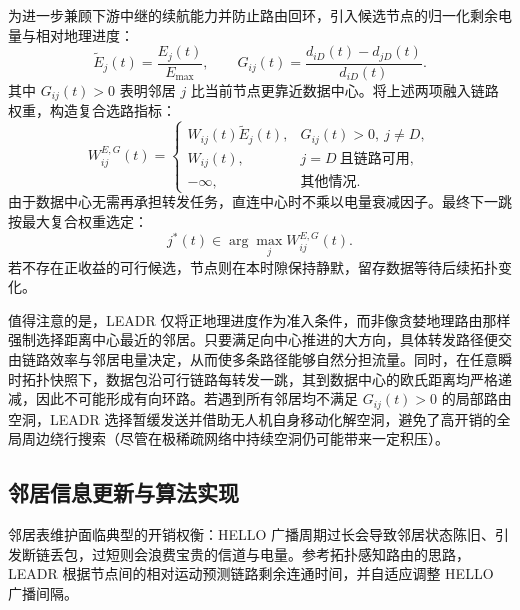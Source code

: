 为进一步兼顾下游中继的续航能力并防止路由回环，引入候选节点的归一化剩余电量与相对地理进度：
\begin{equation}
 \widetilde E_j(t)=\frac{E_j(t)}{E_{\max}},\qquad
 G_{ij}(t)=\frac{d_{iD}(t)-d_{jD}(t)}{d_{iD}(t)}.
 \label{rq1:eq:energy_geography}
\end{equation}
其中 $G_{ij}(t)>0$ 表明邻居 $j$ 比当前节点更靠近数据中心。将上述两项融入链路权重，构造复合选路指标：
\begin{equation}
 W_{ij}^{E,G}(t)=
 \begin{cases}
 W_{ij}(t)\widetilde E_j(t),&G_{ij}(t)>0,\ j\ne D,\\
 W_{ij}(t),&j=D\ \text{且链路可用},\\
 -\infty,&\text{其他情况}.
 \end{cases}
 \label{rq1:eq:composite_weight}
\end{equation}
由于数据中心无需再承担转发任务，直连中心时不乘以电量衰减因子。最终下一跳按最大复合权重选定：
\begin{equation}
 j^*(t)\in\arg\max_jW_{ij}^{E,G}(t).
 \label{rq1:eq:next_hop}
\end{equation}
若不存在正收益的可行候选，节点则在本时隙保持静默，留存数据等待后续拓扑变化。

值得注意的是，LEADR 仅将正地理进度作为准入条件，而非像贪婪地理路由那样强制选择距离中心最近的邻居。只要满足向中心推进的大方向，具体转发路径便交由链路效率与邻居电量决定，从而使多条路径能够自然分担流量。同时，在任意瞬时拓扑快照下，数据包沿可行链路每转发一跳，其到数据中心的欧氏距离均严格递减，因此不可能形成有向环路。若遇到所有邻居均不满足 $G_{ij}(t)>0$ 的局部路由空洞，LEADR 选择暂缓发送并借助无人机自身移动化解空洞，避免了高开销的全局周边绕行搜索（尽管在极稀疏网络中持续空洞仍可能带来一定积压）。

\subsection{邻居信息更新与算法实现}

邻居表维护面临典型的开销权衡：HELLO 广播周期过长会导致邻居状态陈旧、引发断链丢包，过短则会浪费宝贵的信道与电量。参考拓扑感知路由的思路\cite{qtar}，LEADR 根据节点间的相对运动预测链路剩余连通时间，并自适应调整 HELLO 广播间隔。

